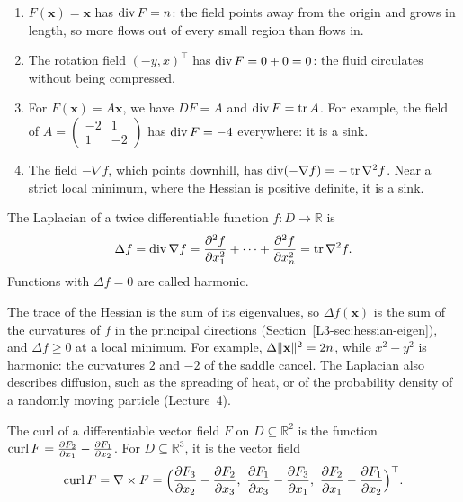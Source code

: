 \begin{example}\label{L3-ex:divergence}
    \begin{enumerate}
        \item $F(\mathbf{x}) = \mathbf{x}$ has $\operatorname{div} F = n$: the field points away from the origin and grows in length, so more flows out of every small region than flows in.
        \item The rotation field $(-y, x)^\top$ has $\operatorname{div} F = 0 + 0 = 0$: the fluid circulates without being compressed.
        \item For $F(\mathbf{x}) = A\mathbf{x}$, we have $DF = A$ and $\operatorname{div} F = \operatorname{tr} A$. For example, the field of $A = \left(\begin{smallmatrix} -2 & 1 \\ 1 & -2 \end{smallmatrix}\right)$ has $\operatorname{div} F = -4$ everywhere: it is a sink.
        \item The field $-\nabla f$, which points downhill, has $\operatorname{div}(-\nabla f) = -\operatorname{tr}\nabla^2 f$. Near a strict local minimum, where the Hessian is positive definite, it is a sink.
    \end{enumerate}
\end{example}

\begin{definition}[Laplacian]\label{L3-def:laplacian}
    The Laplacian of a twice differentiable function $f: D \to \mathbb{R}$ is
    \[\Delta f = \operatorname{div}\nabla f = \frac{\partial^2 f}{\partial x_1^2} + \cdots + \frac{\partial^2 f}{\partial x_n^2} = \operatorname{tr}\nabla^2 f.\]
    Functions with $\Delta f = 0$ are called harmonic.
\end{definition}

The trace of the Hessian is the sum of its eigenvalues, so $\Delta f(\mathbf{x})$ is the sum of the curvatures of $f$ in the principal directions (Section~\ref{L3-sec:hessian-eigen}), and $\Delta f \geq 0$ at a local minimum. For example, $\Delta\lVert \mathbf{x} \rVert^2 = 2n$, while $x^2 - y^2$ is harmonic: the curvatures $2$ and $-2$ of the saddle cancel. The Laplacian also describes diffusion, such as the spreading of heat, or of the probability density of a randomly moving particle (Lecture~4).

\begin{definition}[Curl]\label{L3-def:curl}
    The curl of a differentiable vector field $F$ on $D \subseteq \mathbb{R}^2$ is the function $\operatorname{curl} F = \frac{\partial F_2}{\partial x_1} - \frac{\partial F_1}{\partial x_2}$. For $D \subseteq \mathbb{R}^3$, it is the vector field
    \[\operatorname{curl} F = \nabla \times F = \Big(\frac{\partial F_3}{\partial x_2} - \frac{\partial F_2}{\partial x_3}, \ \frac{\partial F_1}{\partial x_3} - \frac{\partial F_3}{\partial x_1}, \ \frac{\partial F_2}{\partial x_1} - \frac{\partial F_1}{\partial x_2}\Big)^\top.\]
\end{definition}

